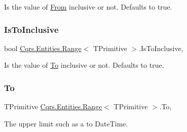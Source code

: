 Is the value of \hyperlink{classCqrs_1_1Entities_1_1Range_a373db08544a25cb6d53411f56e0e072a_a373db08544a25cb6d53411f56e0e072a}{From} inclusive or not. Defaults to true. 

\mbox{\label{classCqrs_1_1Entities_1_1Range_a14cc90fd0525d94b2f3d4c69f19d013e_a14cc90fd0525d94b2f3d4c69f19d013e}} 
\subsubsection{\texorpdfstring{Is\+To\+Inclusive}{IsToInclusive}}
{\footnotesize\ttfamily bool \hyperlink{classCqrs_1_1Entities_1_1Range}{Cqrs.\+Entities.\+Range}$<$ T\+Primitive $>$.Is\+To\+Inclusive\hspace{0.3cm}{\ttfamily [get]}, {\ttfamily [set]}}



Is the value of \hyperlink{classCqrs_1_1Entities_1_1Range_a06daca38005d4f4ff2156b99a95d2f92_a06daca38005d4f4ff2156b99a95d2f92}{To} inclusive or not. Defaults to true. 

\mbox{\label{classCqrs_1_1Entities_1_1Range_a06daca38005d4f4ff2156b99a95d2f92_a06daca38005d4f4ff2156b99a95d2f92}} 
\subsubsection{\texorpdfstring{To}{To}}
{\footnotesize\ttfamily T\+Primitive \hyperlink{classCqrs_1_1Entities_1_1Range}{Cqrs.\+Entities.\+Range}$<$ T\+Primitive $>$.To\hspace{0.3cm}{\ttfamily [get]}, {\ttfamily [set]}}



The upper limit such as a to Date\+Time. 

